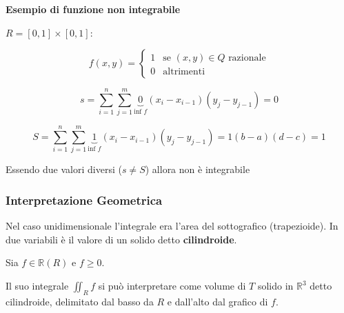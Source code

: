 \documentclass[../appunti-analisi.tex]{subfiles}
\begin{document}
\textbf{Esempio di funzione non integrabile} 

$R = [0,1] \times [0,1]$:

\[
    f(x,y) = \begin{cases}
        1 & \text{se $(x,y) \in Q$ razionale} \\
         0& \text{altrimenti}
    \end{cases}
\]

\[
    s = \sum^{n}_{i=1} \sum^{m}_{j=1} \underbrace{0}_\text{inf $f$} (x_i - x_{i-1})(y_j - y_{j-1}) = 0
\]


\[
    S = \sum^{n}_{i=1} \sum^{m}_{j=1} \underbrace{1}_\text{inf $f$} (x_i - x_{i-1})(y_j - y_{j-1}) = 1 (b-a) (d-c) = 1
\]

Essendo due valori diversi ($s \neq S$) allora non è integrabile

\subsubsection{Interpretazione Geometrica}

Nel caso unidimensionale l'integrale era l'area del sottografico (trapezioide). In due variabili è il valore di un solido detto \textbf{cilindroide}.

Sia $f \in \mathbb{R}(R)$ e $f \ge 0$.

Il suo integrale $\iint_R {f}$ si può interpretare come volume di $T$ solido in $\mathbb{R}^{3}$ detto cilindroide, delimitato dal basso da $R$ e dall'alto dal grafico di $f$.
\end{document}
